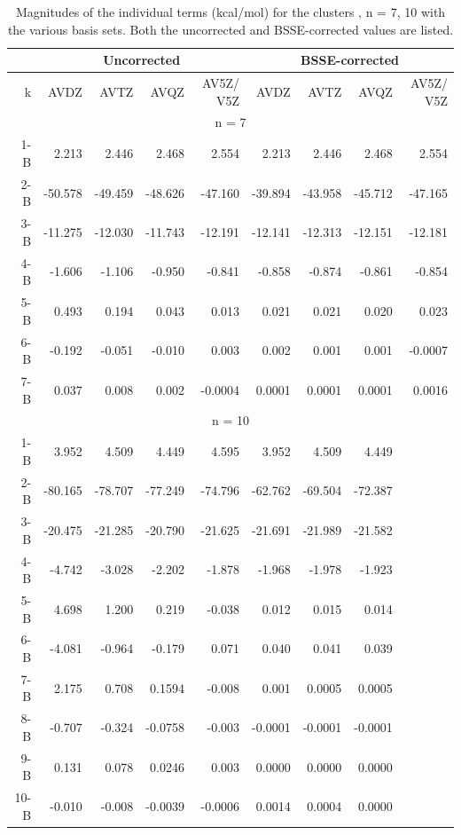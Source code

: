 \documentclass [11pt, proquest] {uwthesis}[2020/02/24]
\begin{document}
\begin{table}[]
\centering
\begin{tabular}{@{}rrrrrrrrr@{}}
\toprule
     & \multicolumn{4}{c}{Uncorrected}         & \multicolumn{4}{c}{BSSE-corrected}      \\ \midrule
k    & AVDZ    & AVTZ    & AVQZ    & AV5Z/ V5Z & AVDZ    & AVTZ    & AVQZ    & AV5Z/ V5Z \\
\hline
\multicolumn{9}{c}{n = 7}                                                                \\
\hline
1-B  & 2.213   & 2.446   & 2.468   & 2.554     & 2.213   & 2.446   & 2.468   & 2.554     \\
2-B  & -50.578 & -49.459 & -48.626 & -47.160   & -39.894 & -43.958 & -45.712 & -47.165   \\
3-B  & -11.275 & -12.030 & -11.743 & -12.191   & -12.141 & -12.313 & -12.151 & -12.181   \\
4-B  & -1.606  & -1.106  & -0.950  & -0.841    & -0.858  & -0.874  & -0.861  & -0.854    \\
5-B  & 0.493   & 0.194   & 0.043   & 0.013     & 0.021   & 0.021   & 0.020   & 0.023     \\
6-B  & -0.192  & -0.051  & -0.010  & 0.003     & 0.002   & 0.001   & 0.001   & -0.0007   \\
7-B  & 0.037   & 0.008   & 0.002   & -0.0004   & 0.0001  & 0.0001  & 0.0001  & 0.0016    \\
\hline
\multicolumn{9}{c}{n = 10}                                                               \\
\hline
1-B  & 3.952   & 4.509   & 4.449   & 4.595     & 3.952   & 4.509   & 4.449   &           \\
2-B  & -80.165 & -78.707 & -77.249 & -74.796   & -62.762 & -69.504 & -72.387 &           \\
3-B  & -20.475 & -21.285 & -20.790 & -21.625   & -21.691 & -21.989 & -21.582 &           \\
4-B  & -4.742  & -3.028  & -2.202  & -1.878    & -1.968  & -1.978  & -1.923  &           \\
5-B  & 4.698   & 1.200   & 0.219   & -0.038    & 0.012   & 0.015   & 0.014   &           \\
6-B  & -4.081  & -0.964  & -0.179  & 0.071     & 0.040   & 0.041   & 0.039   &           \\
7-B  & 2.175   & 0.708   & 0.1594  & -0.008    & 0.001   & 0.0005  & 0.0005  &           \\
8-B  & -0.707  & -0.324  & -0.0758 & -0.003    & -0.0001 & -0.0001 & -0.0001 &           \\
9-B  & 0.131   & 0.078   & 0.0246  & 0.003     & 0.0000  & 0.0000  & 0.0000  &           \\
10-B & -0.010  & -0.008  & -0.0039 & -0.0006   & 0.0014  & 0.0004  & 0.0000  &           \\ \bottomrule
\end{tabular}
\caption{Magnitudes of the individual terms (kcal/mol) for the clusters , n = 7, 10 with the various basis sets. Both the uncorrected and BSSE-corrected values are listed.}
\label{tab:MBE_I_T1}
\end{table}
\end{document}
